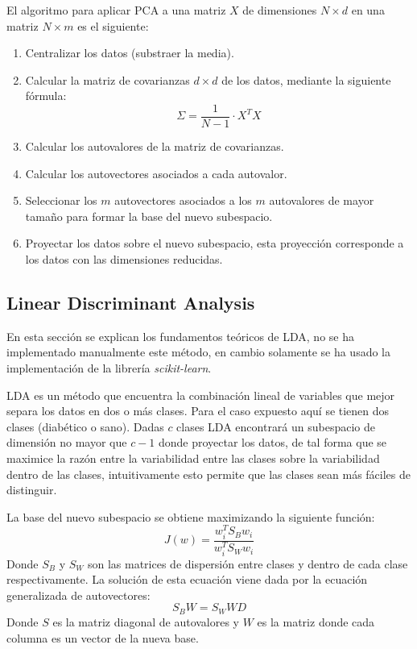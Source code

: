 \documentclass[letter, titlepage, 10pt]{article}
\begin{document}
El algoritmo para aplicar PCA a una matriz $X$ de dimensiones $N \times d$ en una matriz $N \times m$ es el siguiente:
\begin{enumerate}
\item Centralizar los datos (substraer la media).
\item Calcular la matriz de covarianzas $d \times d$ de los datos, mediante la siguiente fórmula:
    \begin{displaymath}
        \Sigma = \frac{1}{N - 1}\cdot X^T X
    \end{displaymath}
\item Calcular los autovalores de la matriz de covarianzas.
\item Calcular los autovectores asociados a cada autovalor.
\item Seleccionar los $m$ autovectores asociados a los $m$ autovalores de mayor tamaño para formar la base del nuevo subespacio.
\item Proyectar los datos sobre el nuevo subespacio, esta proyección corresponde a los datos con las dimensiones reducidas.
\end{enumerate}


\subsection{Linear Discriminant Analysis}
En esta sección se explican los fundamentos teóricos de LDA, no se ha implementado manualmente este método, en cambio solamente se ha usado la implementación de la librería \textit{scikit-learn}. 

LDA es un método que encuentra la combinación lineal de variables que mejor separa los datos en dos o más clases. Para el caso expuesto aquí se tienen dos clases (diabético o sano). Dadas $c$ clases LDA encontrará un subespacio de dimensión no mayor que $c-1$ donde proyectar los datos, de tal forma que se maximice la razón entre la variabilidad entre las clases sobre la variabilidad dentro de las clases, intuitivamente esto permite que las clases sean más fáciles de distinguir.

La base del nuevo subespacio se obtiene maximizando la siguiente función:
\begin{displaymath}
    J(w) = \frac{w_i^T S_B w_i}{w_i^T S_W w_i}
\end{displaymath}
Donde $S_B$ y $S_W$ son las matrices de dispersión entre clases y dentro de cada clase respectivamente. La solución de esta ecuación viene dada por la ecuación generalizada de autovectores:
\begin{displaymath}
    S_B W = S_W W D 
\end{displaymath}
Donde $S$ es la matriz diagonal de autovalores y $W$ es la matriz donde cada columna es un vector de la nueva base.
\end{document}
